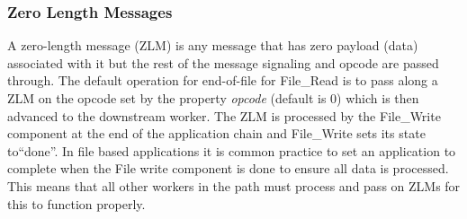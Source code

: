 \subsubsection*{Zero Length Messages}
A zero-length message (ZLM) is any message that has zero payload (data) associated with it but the rest of the message signaling and opcode are passed through.  The default operation for end-of-file for File\_Read is to pass along a ZLM on the opcode set by the property \textit{opcode} (default is 0) which is then advanced to the downstream worker. The ZLM is processed by the File\_Write component at the end of the application chain and File\_Write sets its state to``done''.  In file based applications it is common practice to set an application to complete when the File write component is done to ensure all data is processed.  This means that all other workers in the path must process and pass on ZLMs for this to function properly.
